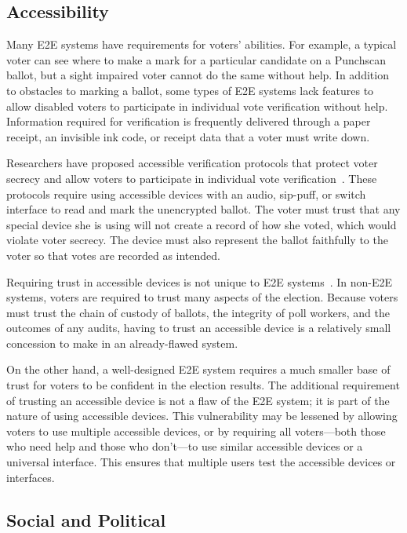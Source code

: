 \subsection{Accessibility}

Many E2E systems have requirements for voters' abilities. For example,
a typical voter can see where to make a mark for a particular
candidate on a Punchscan ballot, but a sight impaired voter cannot do
the same without help. In addition to obstacles to marking a ballot,
some types of E2E systems lack features to allow disabled voters to
participate in individual vote verification without help. Information
required for verification is frequently delivered through a paper
receipt, an invisible ink code, or receipt data that a voter must
write down.

Researchers have proposed accessible verification protocols that
protect voter secrecy and allow voters to participate in individual
vote verification~\cite{chaum2009accessible}. These protocols require
using accessible devices with an audio, sip-puff, or switch interface
to read and mark the unencrypted ballot. The voter must trust that any
special device she is using will not create a record of how she voted,
which would violate voter secrecy. The device must also represent the
ballot faithfully to the voter so that votes are recorded as intended.

Requiring trust in accessible devices is not unique to E2E
systems~\cite{runyan2007improving}. In non-E2E systems, voters are
required to trust many aspects of the election. Because voters must
trust the chain of custody of ballots, the integrity of poll workers,
and the outcomes of any audits, having to trust an accessible device
is a relatively small concession to make in an already-flawed system.

On the other hand, a well-designed E2E system requires a much smaller
base of trust for voters to be confident in the election results. The
additional requirement of trusting an accessible device is not a flaw
of the E2E system; it is part of the nature of using accessible
devices. This vulnerability may be lessened by allowing voters to use
multiple accessible devices, or by requiring all voters---both those
who need help and those who don't---to use similar accessible devices
or a universal interface. This ensures that multiple users test the
accessible devices or interfaces.

\subsection{Social and Political}

